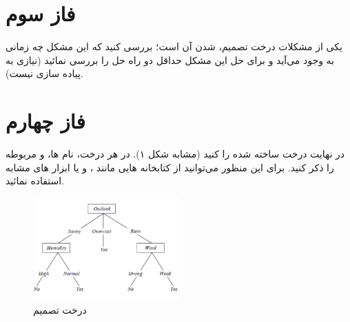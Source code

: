 \documentclass{article}
\begin{document}
	\section{فاز سوم}
	یکی از مشکلات درخت تصمیم،  شدن آن است؛ بررسی کنید که این مشکل چه زمانی به وجود می‌آید و برای حل این مشکل حداقل دو راه حل را بررسی نمائید (نیازی به پیاده سازی نیست).
	
	\section{فاز چهارم}
	در نهایت درخت ساخته شده را  کنید (مشابه شکل ۱). در هر  درخت، نام  ها،   و  مربوطه را ذکر کنید. برای این منظور می‌توانید از کتابخانه  هایی مانند ،   و یا ابزار های مشابه استفاده نمائید.
	\begin{figure}
		\centerline{\includegraphics[width=0.5\textwidth]{dt-diagram.png}}
		\caption{درخت تصمیم}
		\label{fig}
	\end{figure}
	
	
\end{document}
